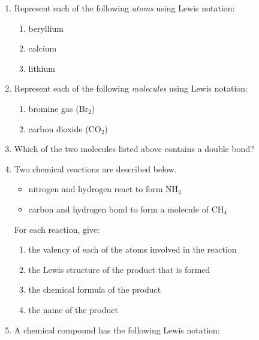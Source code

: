       \label{m38701*id140889}\begin{enumerate}[noitemsep, label=\textbf{\arabic*}. ] 
            \label{m38701*uid23}\item Represent each of the following \textsl{atoms} using Lewis notation:
\label{m38701*id140910}\begin{enumerate}[noitemsep, label=\textbf{\alph*}. ] 
            \label{m38701*uid24}\item beryllium
\label{m38701*uid25}\item calcium
\label{m38701*uid26}\item lithium
\end{enumerate}
                \label{m38701*uid27}\item Represent each of the following \textsl{molecules} using Lewis notation:
\label{m38701*id140969}\begin{enumerate}[noitemsep, label=\textbf{\alph*}. ] 
            \label{m38701*uid28}\item bromine gas (\begin{math}\mathrm{Br}{}_{2}\end{math})
\label{m38701*uid29}\item carbon dioxide (\begin{math}\mathrm{CO}{}_{2}\end{math})
\end{enumerate}
                \label{m38701*uid30}\item Which of the two molecules listed above contains a double bond?\newline
            
\label{m38701*uid31}\item Two chemical reactions are described below.
\label{m38701*id141048}\begin{itemize}[noitemsep]
            \label{m38701*uid32}\item nitrogen and hydrogen react to form \begin{math}\mathrm{NH}{}_{3}\end{math}\label{m38701*uid33}\item carbon and hydrogen bond to form a molecule of \begin{math}\mathrm{CH}{}_{4}\end{math}\end{itemize}
        
For each reaction, give:
\label{m38701*id141106}\begin{enumerate}[noitemsep, label=\textbf{\alph*}. ] 
            \label{m38701*uid34}\item the valency of each of the atoms involved in the reaction
\label{m38701*uid35}\item the Lewis structure of the product that is formed
\label{m38701*uid36}\item the chemical formula of the product
\label{m38701*uid37}\item the name of the product
\end{enumerate}
                \label{m38701*uid38}\item A chemical compound has the following Lewis notation:


\end{enumerate}
